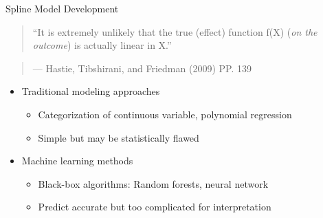 \documentclass[
  ignorenonframetext,
  aspectratio=169]{beamer}
\providecommand{\tightlist}{%
  \setlength{\itemsep}{0pt}\setlength{\parskip}{0pt}}
\begin{document}
\begin{frame}{Spline Model Development}
\begin{quote}
``It is extremely unlikely that the true (effect) function f(X)
(\emph{on the outcome}) is actually linear in X.'' \hspace*{2cm}
\end{quote}

\begin{quote}
--- Hastie, Tibshirani, and Friedman (2009) PP. 139
\end{quote}

\begin{itemize}
\tightlist
\item
  Traditional modeling approaches

  \begin{itemize}
  \tightlist
  \item
    Categorization of continuous variable, polynomial regression
  \item
    Simple but may be statistically flawed
  \end{itemize}
\item
  Machine learning methods

  \begin{itemize}
  \tightlist
  \item
    Black-box algorithms: Random forests, neural network
  \item
    Predict accurate but too complicated for interpretation
  \end{itemize}
\end{itemize}
\end{frame}
\end{document}
